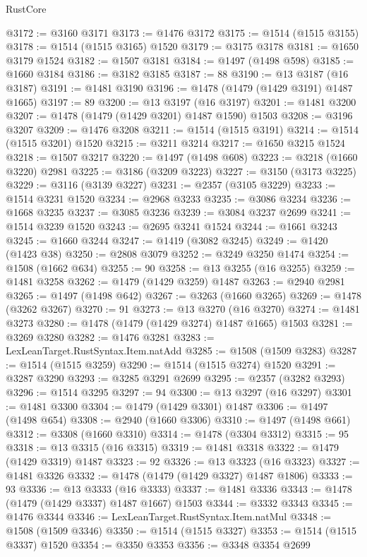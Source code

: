 \begin{lexlean}{RustCore}
\begin{coremodule}
@3172 := @3160 @3171
@3173 := @1476 @3172
@3175 := @1514 (@1515 @3155)
@3178 := @1514 (@1515 @3165) @1520
@3179 := @3175 @3178
@3181 := @1650 @3179 @1524
@3182 := @1507 @3181
@3184 := @1497 (@1498 @598)
@3185 := @1660 @3184
@3186 := @3182 @3185
@3187 := 88
@3190 := @13 @3187 (@16 @3187)
@3191 := @1481 @3190
@3196 := @1478 (@1479 (@1429 @3191) @1487 @1665)
@3197 := 89
@3200 := @13 @3197 (@16 @3197)
@3201 := @1481 @3200
@3207 := @1478 (@1479 (@1429 @3201) @1487 @1590) @1503
@3208 := @3196 @3207
@3209 := @1476 @3208
@3211 := @1514 (@1515 @3191)
@3214 := @1514 (@1515 @3201) @1520
@3215 := @3211 @3214
@3217 := @1650 @3215 @1524
@3218 := @1507 @3217
@3220 := @1497 (@1498 @608)
@3223 := @3218 (@1660 @3220) @2981
@3225 := @3186 (@3209 @3223)
@3227 := @3150 (@3173 @3225)
@3229 := @3116 (@3139 @3227)
@3231 := @2357 (@3105 @3229)
@3233 := @1514 @3231 @1520
@3234 := @2968 @3233
@3235 := @3086 @3234
@3236 := @1668 @3235
@3237 := @3085 @3236
@3239 := @3084 @3237 @2699
@3241 := @1514 @3239 @1520
@3243 := @2695 @3241 @1524
@3244 := @1661 @3243
@3245 := @1660 @3244
@3247 := @1419 (@3082 @3245)
@3249 := @1420 (@1423 @38)
@3250 := @2808 @3079
@3252 := @3249 @3250 @1474
@3254 := @1508 (@1662 @634)
@3255 := 90
@3258 := @13 @3255 (@16 @3255)
@3259 := @1481 @3258
@3262 := @1479 (@1429 @3259) @1487
@3263 := @2940 @2981
@3265 := @1497 (@1498 @642)
@3267 := @3263 (@1660 @3265)
@3269 := @1478 (@3262 @3267)
@3270 := 91
@3273 := @13 @3270 (@16 @3270)
@3274 := @1481 @3273
@3280 := @1478 (@1479 (@1429 @3274) @1487 @1665) @1503
@3281 := @3269 @3280
@3282 := @1476 @3281
@3283 := LexLeanTarget.RustSyntax.Item.natAdd
@3285 := @1508 (@1509 @3283)
@3287 := @1514 (@1515 @3259)
@3290 := @1514 (@1515 @3274) @1520
@3291 := @3287 @3290
@3293 := @3285 @3291 @2699
@3295 := @2357 (@3282 @3293)
@3296 := @1514 @3295
@3297 := 94
@3300 := @13 @3297 (@16 @3297)
@3301 := @1481 @3300
@3304 := @1479 (@1429 @3301) @1487
@3306 := @1497 (@1498 @654)
@3308 := @2940 (@1660 @3306)
@3310 := @1497 (@1498 @661)
@3312 := @3308 (@1660 @3310)
@3314 := @1478 (@3304 @3312)
@3315 := 95
@3318 := @13 @3315 (@16 @3315)
@3319 := @1481 @3318
@3322 := @1479 (@1429 @3319) @1487
@3323 := 92
@3326 := @13 @3323 (@16 @3323)
@3327 := @1481 @3326
@3332 := @1478 (@1479 (@1429 @3327) @1487 @1806)
@3333 := 93
@3336 := @13 @3333 (@16 @3333)
@3337 := @1481 @3336
@3343 := @1478 (@1479 (@1429 @3337) @1487 @1667) @1503
@3344 := @3332 @3343
@3345 := @1476 @3344
@3346 := LexLeanTarget.RustSyntax.Item.natMul
@3348 := @1508 (@1509 @3346)
@3350 := @1514 (@1515 @3327)
@3353 := @1514 (@1515 @3337) @1520
@3354 := @3350 @3353
@3356 := @3348 @3354 @2699

\end{coremodule}
\end{lexlean}
